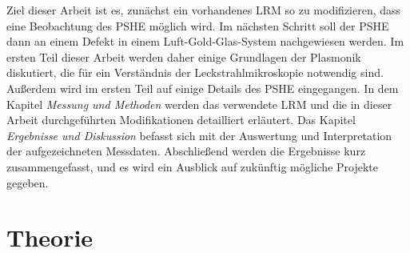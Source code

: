 \documentclass[titlepage]{article}
\begin{document}
	Ziel dieser Arbeit ist es, zunächst ein vorhandenes LRM so zu modifizieren, dass eine Beobachtung des PSHE möglich wird. Im nächsten Schritt soll der PSHE dann an einem Defekt in einem Luft-Gold-Glas-System nachgewiesen werden. Im ersten Teil dieser Arbeit werden daher einige Grundlagen der Plasmonik diskutiert, die für ein Verständnis der Leckstrahlmikroskopie notwendig sind. Außerdem wird im ersten Teil auf einige Details des PSHE eingegangen. In dem Kapitel \textit{Messung und Methoden} werden das verwendete LRM und die in dieser Arbeit durchgeführten Modifikationen detailliert erläutert. Das Kapitel \textit{Ergebnisse und Diskussion} befasst sich mit der Auswertung und Interpretation der aufgezeichneten Messdaten. Abschließend werden die Ergebnisse kurz zusammengefasst, und es wird ein Ausblick auf zukünftig mögliche Projekte gegeben.
	
	\newpage	
	\section{Theorie}
\end{document}
